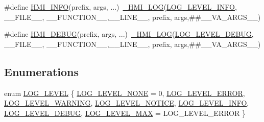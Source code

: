 \begin{DoxyCompactItemize}
\item 
\#define \hyperlink{hmi-debug_8h_a11b249a67108f0f4c50a0fc8a3eb4f5c}{H\+M\+I\+\_\+\+I\+N\+FO}(prefix,  args, ...)~\hyperlink{hmi-debug_8h_a0846b9d51e2e0612c4825a9a581aa40a}{\+\_\+\+H\+M\+I\+\_\+\+L\+OG}(\hyperlink{hmi-debug_8h_aa5a9053636a30269210c54e734e0d583aedee1e3159bfe7d918b6e29873c5aee4}{L\+O\+G\+\_\+\+L\+E\+V\+E\+L\+\_\+\+I\+N\+FO}, \+\_\+\+\_\+\+F\+I\+L\+E\+\_\+\+\_\+, \+\_\+\+\_\+\+F\+U\+N\+C\+T\+I\+O\+N\+\_\+\+\_\+,\+\_\+\+\_\+\+L\+I\+N\+E\+\_\+\+\_\+, prefix, args,\#\#\+\_\+\+\_\+\+V\+A\+\_\+\+A\+R\+G\+S\+\_\+\+\_\+)
\item 
\#define \hyperlink{hmi-debug_8h_a0d26d8b8201011dade787236519711c0}{H\+M\+I\+\_\+\+D\+E\+B\+UG}(prefix,  args, ...)~\hyperlink{hmi-debug_8h_a0846b9d51e2e0612c4825a9a581aa40a}{\+\_\+\+H\+M\+I\+\_\+\+L\+OG}(\hyperlink{hmi-debug_8h_aa5a9053636a30269210c54e734e0d583a538b2b6e011479d408ecd2be0f6d6177}{L\+O\+G\+\_\+\+L\+E\+V\+E\+L\+\_\+\+D\+E\+B\+UG}, \+\_\+\+\_\+\+F\+I\+L\+E\+\_\+\+\_\+, \+\_\+\+\_\+\+F\+U\+N\+C\+T\+I\+O\+N\+\_\+\+\_\+,\+\_\+\+\_\+\+L\+I\+N\+E\+\_\+\+\_\+, prefix, args,\#\#\+\_\+\+\_\+\+V\+A\+\_\+\+A\+R\+G\+S\+\_\+\+\_\+)
\end{DoxyCompactItemize}
\subsection*{Enumerations}
\begin{DoxyCompactItemize}
\item 
enum \hyperlink{hmi-debug_8h_aa5a9053636a30269210c54e734e0d583}{L\+O\+G\+\_\+\+L\+E\+V\+EL} \{ \newline
\hyperlink{hmi-debug_8h_aa5a9053636a30269210c54e734e0d583a69dacb1837e1e37c6ed34cc2ee1d8848}{L\+O\+G\+\_\+\+L\+E\+V\+E\+L\+\_\+\+N\+O\+NE} = 0, 
\hyperlink{hmi-debug_8h_aa5a9053636a30269210c54e734e0d583a5b40f003febbc3b535649d63f4b8a44f}{L\+O\+G\+\_\+\+L\+E\+V\+E\+L\+\_\+\+E\+R\+R\+OR}, 
\hyperlink{hmi-debug_8h_aa5a9053636a30269210c54e734e0d583a5b4dd81b4dc7eefbc55ba03415c627ef}{L\+O\+G\+\_\+\+L\+E\+V\+E\+L\+\_\+\+W\+A\+R\+N\+I\+NG}, 
\hyperlink{hmi-debug_8h_aa5a9053636a30269210c54e734e0d583a23ae4d711a7bbb3900240cb7316b4b4e}{L\+O\+G\+\_\+\+L\+E\+V\+E\+L\+\_\+\+N\+O\+T\+I\+CE}, 
\newline
\hyperlink{hmi-debug_8h_aa5a9053636a30269210c54e734e0d583aedee1e3159bfe7d918b6e29873c5aee4}{L\+O\+G\+\_\+\+L\+E\+V\+E\+L\+\_\+\+I\+N\+FO}, 
\hyperlink{hmi-debug_8h_aa5a9053636a30269210c54e734e0d583a538b2b6e011479d408ecd2be0f6d6177}{L\+O\+G\+\_\+\+L\+E\+V\+E\+L\+\_\+\+D\+E\+B\+UG}, 
\hyperlink{hmi-debug_8h_aa5a9053636a30269210c54e734e0d583a0459003454bc8bb17752e6d8e5787444}{L\+O\+G\+\_\+\+L\+E\+V\+E\+L\+\_\+\+M\+AX} = L\+O\+G\+\_\+\+L\+E\+V\+E\+L\+\_\+\+E\+R\+R\+OR
 \}
\end{DoxyCompactItemize}
